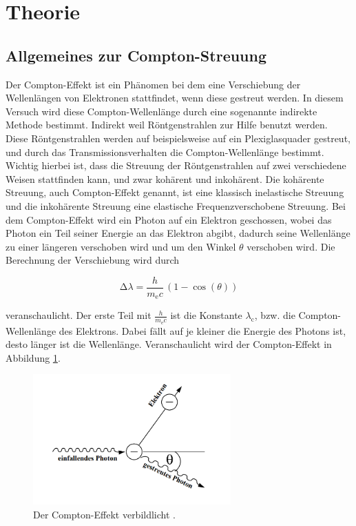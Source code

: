 \section{Theorie}

\subsection{Allgemeines zur Compton-Streuung}  

\begin{flushleft}
    Der Compton-Effekt ist ein Phänomen bei dem eine Verschiebung der Wellenlängen von Elektronen stattfindet, wenn diese gestreut werden.
    In diesem Versuch wird diese Compton-Wellenlänge durch eine sogenannte indirekte Methode bestimmt. 
    Indirekt weil Röntgenstrahlen zur Hilfe benutzt werden.
    Diese Röntgenstrahlen werden auf beispielsweise auf ein Plexiglasquader gestreut, und durch das Transmissionsverhalten die Compton-Wellenlänge bestimmt.
    Wichtig hierbei ist, dass die Streuung der Röntgenstrahlen auf zwei verschiedene Weisen stattfinden kann, und zwar kohärent und inkohärent.
    Die kohärente Streuung, auch Compton-Effekt genannt, ist eine klassisch inelastische Streuung und die inkohärente Streuung eine elastische Frequenzverschobene Streuung.
    Bei dem Compton-Effekt wird ein Photon auf ein Elektron geschossen, wobei das Photon ein Teil seiner Energie an das Elektron abgibt, dadurch seine Wellenlänge zu einer längeren verschoben wird und um den Winkel $\theta$ verschoben wird.
    Die Berechnung der Verschiebung wird durch 
\end{flushleft}

\begin{equation}
    \increment \lambda = \frac{h}{m_{\text{e}}c}\,(1 - \cos(\theta) ) \label{1}
\end{equation}

\begin{flushleft} 
    veranschaulicht.
    Der erste Teil mit $\frac{h}{m_{\text{e}}c}$ ist die Konstante $\lambda_{\text{c}}$, bzw. die Compton-Wellenlänge des Elektrons. 
    Dabei fällt auf je kleiner die Energie des Photons ist, desto länger ist die Wellenlänge.
    Veranschaulicht wird der Compton-Effekt in Abbildung \ref{Abbildung1}.
\end{flushleft}

\begin{figure}[H]       
    \centering
    \includegraphics[height=50mm]{bilder/comptoneff.png}
    \caption{Der Compton-Effekt verbildlicht \cite{a1}.\label{Abbildung1} }
\end{figure}

